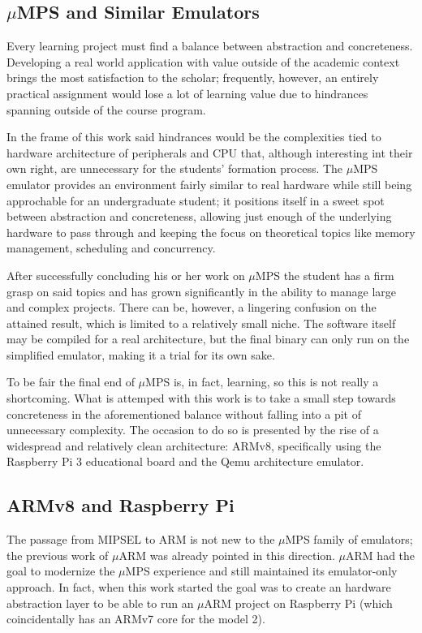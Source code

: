 \documentclass[12pt,a4paper,openright,twoside]{report}
\begin{document}
\subsection{$\mu$MPS and Similar Emulators}
Every learning project must find a balance between abstraction and concreteness.
Developing a real world application with value outside of the academic context
 brings the most satisfaction to the scholar; frequently, however, an entirely
 practical assignment would lose a lot of learning value due to hindrances
 spanning outside of the course program.
 
In the frame of this work said hindrances would be the complexities tied to
hardware architecture of peripherals and CPU that, although interesting
int their own right, are unnecessary for the students' formation process.
The $\mu$MPS emulator provides an environment fairly similar to real hardware
while still being approchable for an undergraduate student; it positions itself
in a sweet spot between abstraction and concreteness, allowing just enough
of the underlying hardware to pass through and keeping the focus on 
theoretical topics like memory management, scheduling and concurrency.

After successfully concluding his or her work on $\mu$MPS the student has
a firm grasp on said topics and has grown significantly in the ability to
manage large and complex projects. There can be, however, a lingering confusion
on the attained result, which is limited to a relatively small niche.
The software itself may be compiled for a real architecture, but the final binary
can only run on the simplified emulator, making it a trial for its own sake.

To be fair the final end of $\mu$MPS is, in fact, learning, so this is not really a shortcoming.
What is attemped with this work is to take a small step towards concreteness in 
the aforementioned balance without falling into a pit of unnecessary complexity.
The occasion to do so is presented by the rise of a widespread and relatively
clean architecture: ARMv8, specifically using the Raspberry Pi 3 educational board
and the Qemu architecture emulator.

\subsection{ARMv8 and Raspberry Pi}
The passage from MIPSEL to ARM is not new to the $\mu$MPS family of emulators; 
the previous work
of $\mu$ARM was already pointed in this direction. $\mu$ARM had the goal to
modernize the $\mu$MPS experience and still maintained its emulator-only approach.
In fact, when this work started the goal was to create an hardware abstraction
layer to be able to run an $\mu$ARM project on Raspberry Pi (which 
coincidentally has an ARMv7 core for the model 2).
\end{document}
